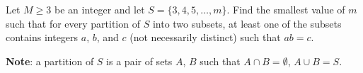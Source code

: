 Let $ M \ge 3$ be an integer and let $ S = \{3,4,5,\ldots,m\}$. Find the smallest value of $ m$ such that for every partition of $ S$ into two subsets, at least one of the subsets contains integers $ a$, $ b$, and $ c$ (not necessarily distinct) such that $ ab = c$.

\textbf{Note}: a partition of $ S$ is a pair of sets $ A$, $ B$ such that $ A \cap B = \emptyset$, $ A \cup B = S$.